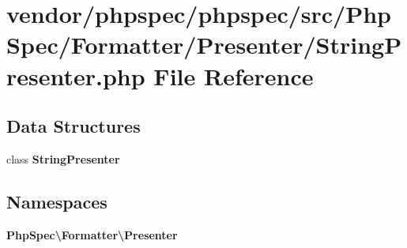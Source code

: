 \section{vendor/phpspec/phpspec/src/\+Php\+Spec/\+Formatter/\+Presenter/\+String\+Presenter.php File Reference}
\label{_string_presenter_8php}
\subsection*{Data Structures}
\begin{DoxyCompactItemize}
\item 
class {\bf String\+Presenter}
\end{DoxyCompactItemize}
\subsection*{Namespaces}
\begin{DoxyCompactItemize}
\item 
 {\bf Php\+Spec\textbackslash{}\+Formatter\textbackslash{}\+Presenter}
\end{DoxyCompactItemize}
